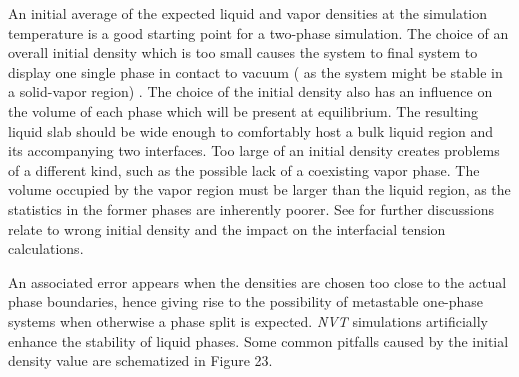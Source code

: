 \documentclass{scrbook}
\begin{document}
An initial average of the expected liquid and vapor densities at the simulation
temperature is a good starting point for a two-phase simulation. The choice of
an overall initial density which is too small causes the system to final system
to display one single phase in contact to vacuum ( as the system might be
stable in a solid-vapor region) . The choice of the initial density also has an
influence on the volume of each phase which will be present at equilibrium. The
resulting liquid slab should be wide enough to comfortably host a bulk liquid
region and its accompanying two interfaces. Too large of an initial density
creates problems of a different kind, such as the possible lack of a coexisting
vapor phase. The volume occupied by the vapor region must be larger than the
liquid region, as the statistics in the former phases are inherently poorer.
See \citet{holcomb1993} for further discussions relate
to wrong initial density and the impact on the interfacial tension
calculations.

An associated error appears when the densities are chosen too close to the
actual phase boundaries, hence giving rise to the possibility of metastable
one-phase systems when otherwise a phase split is expected. \textit{NVT}
simulations artificially enhance the stability of liquid phases. Some common
pitfalls caused by the initial density value are schematized in Figure 23.
\end{document}
